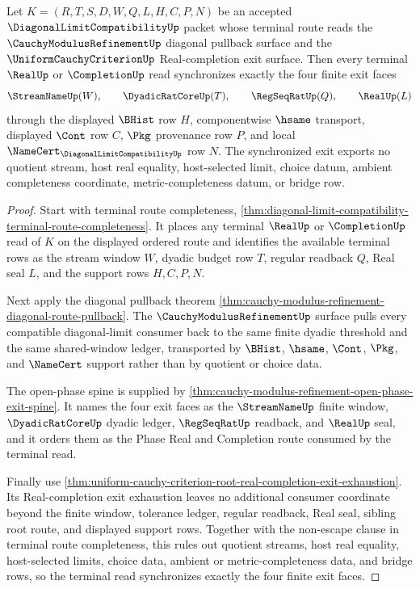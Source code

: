 \begin{theorem}
\label{thm:diagonal-limit-compatibility-open-phase-exit-synchronization}
Let $K=(R,T,S,D,W,Q,L,H,C,P,N)$ be an accepted $\DiagonalLimitCompatibilityUp$ packet whose terminal route reads the $\CauchyModulusRefinementUp$ diagonal pullback surface and the $\UniformCauchyCriterionUp$ Real-completion exit surface. Then every terminal $\RealUp$ or $\CompletionUp$ read synchronizes exactly the four finite exit faces
$$
\StreamNameUp(W),\qquad \DyadicRatCoreUp(T),\qquad \RegSeqRatUp(Q),\qquad \RealUp(L)
$$
through the displayed $\BHist$ row $H$, componentwise $\hsame$ transport, displayed $\Cont$ row $C$, $\Pkg$ provenance row $P$, and local $\NameCert_{\DiagonalLimitCompatibilityUp}$ row $N$. The synchronized exit exports no quotient stream, host real equality, host-selected limit, choice datum, ambient completeness coordinate, metric-completeness datum, or bridge row.
\end{theorem}
\begin{proof}
Start with terminal route completeness, \autoref{thm:diagonal-limit-compatibility-terminal-route-completeness}. It places any terminal $\RealUp$ or $\CompletionUp$ read of $K$ on the displayed ordered route and identifies the available terminal rows as the stream window $W$, dyadic budget row $T$, regular readback $Q$, Real seal $L$, and the support rows $H,C,P,N$.

Next apply the diagonal pullback theorem \autoref{thm:cauchy-modulus-refinement-diagonal-route-pullback}. The $\CauchyModulusRefinementUp$ surface pulls every compatible diagonal-limit consumer back to the same finite dyadic threshold and the same shared-window ledger, transported by $\BHist$, $\hsame$, $\Cont$, $\Pkg$, and $\NameCert$ support rather than by quotient or choice data.

The open-phase spine is supplied by \autoref{thm:cauchy-modulus-refinement-open-phase-exit-spine}. It names the four exit faces as the $\StreamNameUp$ finite window, $\DyadicRatCoreUp$ dyadic ledger, $\RegSeqRatUp$ readback, and $\RealUp$ seal, and it orders them as the Phase Real and Completion route consumed by the terminal read.

Finally use \autoref{thm:uniform-cauchy-criterion-root-real-completion-exit-exhaustion}. Its Real-completion exit exhaustion leaves no additional consumer coordinate beyond the finite window, tolerance ledger, regular readback, Real seal, sibling root route, and displayed support rows. Together with the non-escape clause in terminal route completeness, this rules out quotient streams, host real equality, host-selected limits, choice data, ambient or metric-completeness data, and bridge rows, so the terminal read synchronizes exactly the four finite exit faces.
\end{proof}

